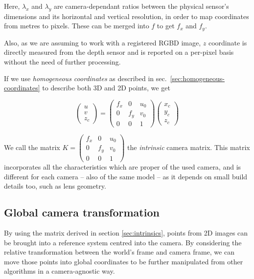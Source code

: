 Here, $\lambda _x$ and $\lambda _y$ are camera-dependant ratios between the
physical sensor's dimensions and its horizontal and vertical resolution, in
order to map coordinates from metres to pixels. These can be merged into $f$ to
get $f_x$ and $f_y$.

Also, as we are assuming to work with a registered RGBD image, $z$ coordinate is
directly measured from the depth sensor and is reported on a per-pixel basis
without the need of further processing.

If we use \emph{homogeneous coordinates} as described in sec.~\ref{sec:homogeneous-coordinates}
to describe both 3D and 2D points, we get

\begin{equation} \label{eqn:intrinsics}
\left(\begin{array}{c}u\\v\\z_c\end{array}\right)
  =
  \left(\begin{array}{cccc}
      f_x & 0 & u_0 \\
      0 & f_y & v_0 \\
      0 & 0   & 1 
  \end{array}\right)
\left(\begin{array}{c}x_c\\y_c\\z_c\end{array}\right)
\end{equation}

We call the matrix 
$K=
  \left(\begin{array}{cccc}
      f_x & 0 & u_0 \\
      0 & f_y & v_0 \\
      0 & 0   & 1 
\end{array}\right)$
the \emph{intrinsic} camera matrix. This matrix incorporates all the
characteristics which are proper of the used camera, and is different for each
camera -- also of the same model -- as it depends on small build details too,
such as lens geometry.

\subsection{Global camera transformation}
By using the matrix derived in section \ref{sec:intrinsics}, points from 2D
images can be brought into a reference system centred into the camera.
By considering the relative transformation between the world's frame and camera
frame, we can move those points into global coordinates to be further
manipulated from other algorithms in a camera-agnostic way.

